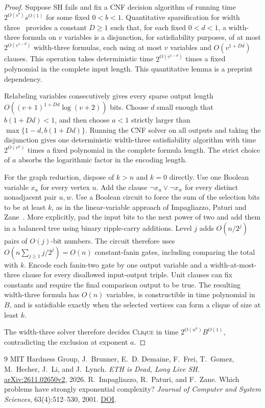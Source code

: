 \documentclass[11pt]{article}
\begin{document}
\begin{proof}
Suppose SH fails and fix a CNF decision algorithm of running time
\(2^{O(s^b)}s^{O(1)}\) for some fixed \(0<b<1\).
Quantitative sparsification for width three~\cite[Lemma~2.2]{sh}
provides a constant \(D\ge1\) such that, for each fixed \(0<d<1\),
a width-three formula on \(v\) variables is a disjunction, for
satisfiability purposes, of at most \(2^{O(v^{1-d})}\) width-three
formulas, each using at most \(v\) variables and
\(O(v^{1+Dd})\) clauses. This operation takes deterministic time
\(2^{O(v^{1-d})}\) times a fixed polynomial in the complete input
length. This quantitative lemma is a preprint dependency.

Relabeling variables consecutively gives every sparse output length
\(O((v+1)^{1+Dd}\log(v+2))\) bits. Choose \(d\) small enough that
\(b(1+Dd)<1\), and then choose \(a<1\) strictly larger than
\(\max\{1-d,b(1+Dd)\}\). Running the CNF solver on all outputs and taking
the disjunction gives one deterministic width-three satisfiability
algorithm with time \(2^{O(v^a)}\) times a fixed polynomial in the
complete formula length. The strict choice of \(a\) absorbs the
logarithmic factor in the encoding length.

For the graph reduction, dispose of \(k>n\) and \(k=0\) directly.
Use one Boolean variable \(x_u\) for every vertex \(u\). Add the clause
\(\neg x_u\lor\neg x_w\) for every distinct nonadjacent pair \(u,w\).
Use a Boolean circuit to force the sum of the selection bits to be
at least \(k\), as in the linear-variable approach of
Impagliazzo, Paturi and Zane~\cite[Theorem~5]{ipz}. More explicitly,
pad the input bits to the next power of two and add them in a balanced
tree using binary ripple-carry additions. Level \(j\) adds
\(O(n/2^j)\) pairs of \(O(j)\)-bit numbers. The circuit therefore uses
\(O(n\sum_{j\ge1}j/2^j)=O(n)\) constant-fanin gates, including comparing
the total with \(k\). Encode each fanin-two gate by one output variable
and a width-at-most-three clause for every disallowed input-output
triple. Unit clauses can fix constants and require the final comparison
output to be true. The resulting width-three formula has
\(O(n)\) variables, is constructible in time polynomial in \(B\), and is
satisfiable exactly when the selected vertices can form a clique of size
at least \(k\).

The width-three solver therefore decides \textsc{Clique} in time
\(2^{O(n^a)}B^{O(1)}\), contradicting the exclusion at exponent \(a\).
\end{proof}

\begin{thebibliography}{9}
MIT Hardness Group, J.~Brunner, E.~D. Demaine, F.~Frei, T.~Gomez,
M.~Hecher, J.~Li, and J.~Lynch.
\emph{ETH is Dead, Long Live SH}.
\href{https://arxiv.org/abs/2611.02650v2}{arXiv:2611.02650v2}, 2026.
R.~Impagliazzo, R.~Paturi, and F.~Zane.
Which problems have strongly exponential complexity?
\emph{Journal of Computer and System Sciences}, 63(4):512--530, 2001.
\href{https://doi.org/10.1006/jcss.2001.1774}{DOI}.
\end{thebibliography}
\end{document}
